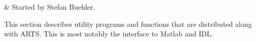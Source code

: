 %
%
 \label{sec:utilities}

%
%
 & Started by Stefan Buehler.\\
\stophistory


This section describes utility programs and functions that are
distributed along with ARTS. This is most notably the interface to
Matlab and IDL.


\label{sec:utilities:aii}







